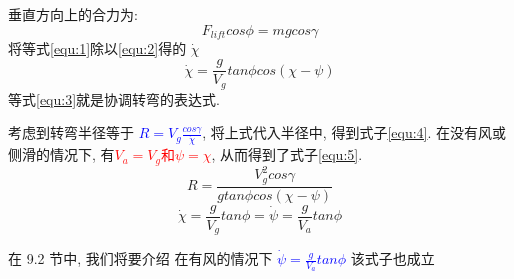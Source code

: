 垂直方向上的合力为:
\begin{equation}
    F_{lift} cos \phi = mg cos\gamma
    \label{equ:2}
\end{equation}
将等式\ref{equ:1}除以\ref{equ:2}得的 $\dot{\chi}$
\begin{equation}
    \dot{\chi} = \frac{g}{V_{g}} tan \phi cos(\chi - \psi)
    \label{equ:3}
\end{equation}
等式\ref{equ:3}就是协调转弯的表达式. 
\par 考虑到转弯半径等于 \textcolor{blue}{ $R = V_{g} \frac{cos \gamma}{\dot{\chi}}$}, 将上式代入半径中, 得到式子\ref{equ:4}. 在没有风或侧滑的情况下, 有\textcolor{red}{$V_{a} = V_{g}$和$\psi = \chi$}, 从而得到了式子\ref{equ:5}. 
\begin{equation}
    R = \frac{V_{g}^{2} cos \gamma}{g tan \phi cos(\chi - \psi)} 
    \label{equ:4}
\end{equation}
\begin{equation}
    \dot{\chi} = \frac{g}{V_{g}} tan \phi = \dot{\psi} = \frac{g}{V_{a}} tan \phi
    \label{equ:5}
\end{equation}
\par 在 9.2 节中, 我们将要介绍 在有风的情况下 \textcolor{blue}{$ \dot{\psi} = \frac{g}{V_{a}} tan \phi$} 该式子也成立
\clearpage
